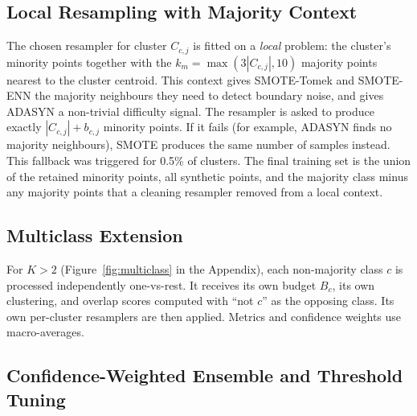 \documentclass[11pt,a4paper]{article}
\begin{document}
\subsection{Local Resampling with Majority Context}

The chosen resampler for cluster $C_{c,j}$ is fitted on a \emph{local} problem: the cluster's minority points together with the $k_m=\max(3|C_{c,j}|,10)$ majority points nearest to the cluster centroid. This context gives SMOTE-Tomek and SMOTE-ENN the majority neighbours they need to detect boundary noise, and gives ADASYN a non-trivial difficulty signal. The resampler is asked to produce exactly $|C_{c,j}|+b_{c,j}$ minority points. If it fails (for example, ADASYN finds no majority neighbours), SMOTE produces the same number of samples instead. This fallback was triggered for 0.5\% of clusters. The final training set is the union of the retained minority points, all synthetic points, and the majority class minus any majority points that a cleaning resampler removed from a local context.

\subsection{Multiclass Extension}

For $K>2$ (Figure~\ref{fig:multiclass} in the Appendix), each non-majority class $c$ is processed independently one-vs-rest. It receives its own budget $B_c$, its own clustering, and overlap scores computed with ``not $c$'' as the opposing class. Its own per-cluster resamplers are then applied. Metrics and confidence weights use macro-averages.

\subsection{Confidence-Weighted Ensemble and Threshold Tuning}
\end{document}
